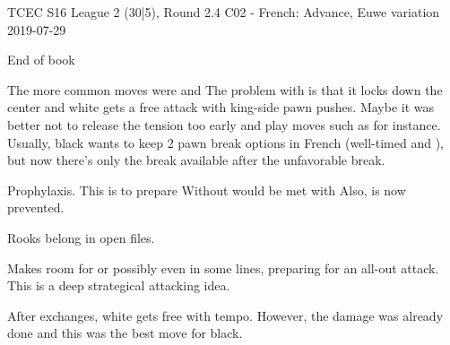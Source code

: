 
%
          {TCEC S16 League 2 (30|5), Round 2.4}%
          {C02 - French: Advance, Euwe variation}%
          {2019-07-29}



End of book


The more common moves were 
and  The problem with 
is that it locks down the center and white gets a free attack with
king-side pawn pushes. Maybe it was better not to release the tension
too early and play moves such as  for instance. Usually,
black wants to keep 2 pawn break options in French
(well-timed  and ), but now there's only
the  break available after the unfavorable break.


Prophylaxis. This is to prepare 
Without   would be met with 
Also,  is now prevented.


Rooks belong in open files.


Makes room for  or possibly even  in some lines,
preparing for an all-out attack. This is a deep strategical attacking
idea.


After exchanges, white gets free  with tempo. However, the
damage was already done and this was the best move for black.

